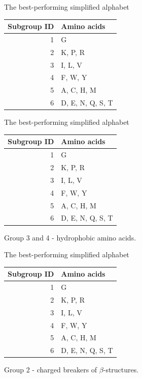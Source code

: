\documentclass{beamer}\usepackage[]{graphicx}\usepackage[]{color}
\begin{document}
     \begin{frame}{The best-performing simplified alphabet}

   \begin{table}[ht]
\centering
\begin{tabular}{rl}
  \toprule
Subgroup ID & Amino acids \\ 
  \midrule
  1 & G \\ 
   \rowcolor[gray]{0.85}  2 & K, P, R \\ 
    3 & I, L, V \\ 
   \rowcolor[gray]{0.85}  4 & F, W, Y \\ 
    5 & A, C, H, M \\ 
   \rowcolor[gray]{0.85}  6 & D, E, N, Q, S, T \\ 
   \bottomrule
\end{tabular}
\end{table}
   
   \end{frame}

     \begin{frame}{The best-performing simplified alphabet}
   \begin{table}[ht]
\centering
\begin{tabular}{rl}
  \toprule
Subgroup ID & Amino acids \\ 
  \midrule
  1 & G \\ 
   \rowcolor[gray]{0.85}  2 & K, P, R \\ 
   \rowcolor{blue!20} 3 & I, L, V \\ 
   \rowcolor{blue!20}  4 & F, W, Y \\ 
    5 & A, C, H, M \\ 
   \rowcolor[gray]{0.85}  6 & D, E, N, Q, S, T \\ 
   \bottomrule
\end{tabular}
\end{table}
   
Group 3 and 4 - hydrophobic amino acids.  
   \end{frame}
  
  
     \begin{frame}{The best-performing simplified alphabet}
   \begin{table}[ht]
\centering
\begin{tabular}{rl}
  \toprule
Subgroup ID & Amino acids \\ 
  \midrule
  1 & G \\ 
   \rowcolor{red!20}  2 & K, P, R \\ 
    3 & I, L, V \\ 
   \rowcolor[gray]{0.85}  4 & F, W, Y \\ 
    5 & A, C, H, M \\ 
   \rowcolor[gray]{0.85}  6 & D, E, N, Q, S, T \\ 
   \bottomrule
\end{tabular}
\end{table}
   
Group 2 - charged breakers of $\beta$-structures.  
   
   \end{frame}  
   
\end{document}
